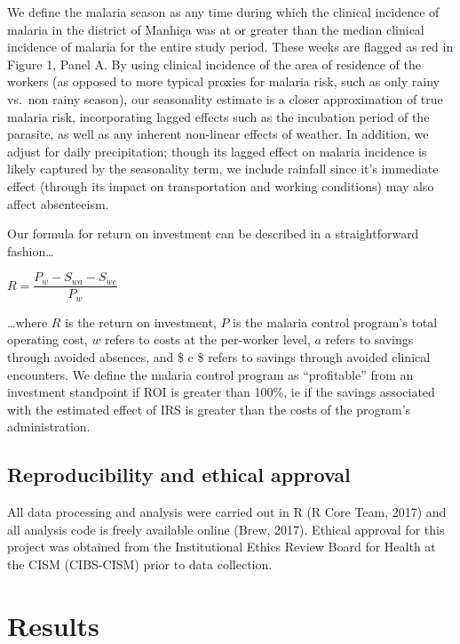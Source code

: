 \documentclass[]{article}
\begin{document}
We define the malaria season as any time during which the clinical
incidence of malaria in the district of Manhiça was at or greater than
the median clinical incidence of malaria for the entire study period.
These weeks are flagged as red in Figure 1, Panel A. By using clinical
incidence of the area of residence of the workers (as opposed to more
typical proxies for malaria risk, such as only rainy vs.~non rainy
season), our seasonality estimate is a closer approximation of true
malaria risk, incorporating lagged effects such as the incubation period
of the parasite, as well as any inherent non-linear effects of weather.
In addition, we adjust for daily precipitation; though its lagged effect
on malaria incidence is likely captured by the seasonality term, we
include rainfall since it's immediate effect (through its impact on
transportation and working conditions) may also affect absenteeism.

Our formula for return on investment can be described in a
straightforward fashion\ldots{}

\begin{center}
$R = \dfrac{P_{w} - S_{wa} - S_{wc}}{P_{w}}$

\end{center}

\ldots{}where \(R\) is the return on investment, \(P\) is the malaria
control program's total operating cost, \(w\) refers to costs at the
per-worker level, \(a\) refers to savings through avoided absences, and
\$ c \$ refers to savings through avoided clinical encounters. We define
the malaria control program as ``profitable'' from an investment
standpoint if ROI is greater than 100\%, ie if the savings associated
with the estimated effect of IRS is greater than the costs of the
program's administration.

\subsection{Reproducibility and ethical
approval}\label{reproducibility-and-ethical-approval}

All data processing and analysis were carried out in R (R Core Team,
2017) and all analysis code is freely available online (Brew, 2017).
Ethical approval for this project was obtained from the Institutional
Ethics Review Board for Health at the CISM (CIBS-CISM) prior to data
collection.

\newpage

\section{Results}\label{results}
\end{document}
